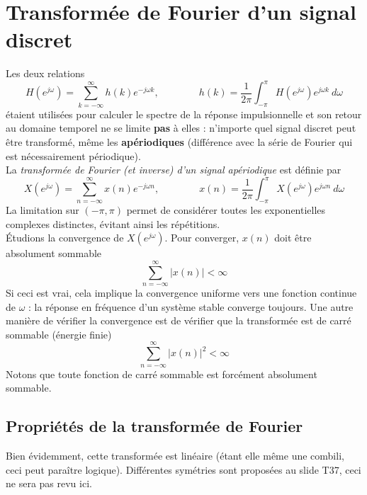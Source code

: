 \section{Transformée de Fourier d'un signal discret}
Les deux relations
\begin{equation}
H(e^{j\omega}) = \sum_{k=-\infty}^\infty h(k)e^{-j\omega k},\qquad\qquad h(k) = \dfrac{1}{2\pi}
\int_{-\pi}^\pi H(e^{j\omega}) e^{j\omega k}\ d\omega
\end{equation}
étaient utilisées pour calculer le spectre de la réponse impulsionnelle et son 
retour au domaine temporel ne se limite \textbf{pas} à elles : n'importe quel signal discret 
peut être transformé, même les \textbf{apériodiques} (différence avec la série de Fourier qui 
est nécessairement périodique).\\
La \textit{transformée de Fourier (et inverse) d'un signal apériodique} est définie par
\begin{equation}
X(e^{j\omega}) = \sum_{n=-\infty}^\infty x(n)e^{-j\omega n},\qquad\qquad x(n) = \dfrac{1}{2\pi}
\int_{-\pi}^\pi X(e^{j\omega}) e^{j\omega n}\ d\omega
\end{equation}
La limitation sur $(-\pi,\pi)$ permet de considérer toutes les exponentielles complexes 
distinctes, évitant ainsi les répétitions. \\
Étudions la convergence de $X(e^{j\omega})$. Pour converger, $x(n)$ doit être absolument sommable
\begin{equation}
\sum_{n=-\infty}^\infty |x(n)|<\infty
\end{equation}
Si ceci est vrai, cela implique la convergence uniforme vers une fonction continue de $\omega$ : 
la réponse en fréquence d'un système stable converge toujours.  Une autre manière de vérifier la 
convergence est de vérifier que la transformée est de carré sommable (énergie finie)
\begin{equation}
\sum_{n=-\infty}^\infty |x(n)|^2<\infty
\end{equation}
Notons que toute fonction de carré sommable est forcément absolument sommable.

	\subsection{Propriétés de la transformée de Fourier}
	Bien évidemment, cette transformée est linéaire (étant elle même une combili, ceci peut 
	paraître logique). Différentes symétries sont proposées au slide T37, ceci ne sera pas 
	revu ici.
	
